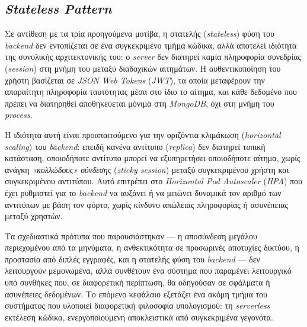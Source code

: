 \subsection{\textit{Stateless Pattern}}

Σε αντίθεση με τα τρία προηγούμενα μοτίβα, η στατελής (\textit{stateless}) φύση του \textit{backend} δεν εντοπίζεται σε ένα συγκεκριμένο τμήμα κώδικα, αλλά αποτελεί ιδιότητα της συνολικής αρχιτεκτονικής του: ο \textit{server} δεν διατηρεί καμία πληροφορία συνεδρίας (\textit{session}) στη μνήμη του μεταξύ διαδοχικών αιτημάτων. Η αυθεντικοποίηση του χρήστη βασίζεται σε \textit{JSON Web Tokens} (\textit{JWT}), τα οποία μεταφέρουν την απαραίτητη πληροφορία ταυτότητας μέσα στο ίδιο το αίτημα, και κάθε δεδομένο που πρέπει να διατηρηθεί αποθηκεύεται μόνιμα στη \textit{MongoDB}, όχι στη μνήμη του \textit{process}.

Η ιδιότητα αυτή είναι προαπαιτούμενο για την οριζόντια κλιμάκωση (\textit{horizontal scaling}) του \textit{backend}: επειδή κανένα αντίτυπο (\textit{replica}) δεν διατηρεί τοπική κατάσταση, οποιοδήποτε αντίτυπο μπορεί να εξυπηρετήσει οποιοδήποτε αίτημα, χωρίς ανάγκη \textit{«κολλώδους» σύνδεσης} (\textit{sticky session}) μεταξύ συγκεκριμένου χρήστη και συγκεκριμένου αντιτύπου. Αυτό επιτρέπει στο \textit{Horizontal Pod Autoscaler} (\textit{HPA}) που έχει ρυθμιστεί για το \textit{backend} να αυξάνει ή να μειώνει δυναμικά τον αριθμό των αντιτύπων με βάση τον φόρτο, χωρίς κίνδυνο απώλειας πληροφορίας ή ασυνέπειας μεταξύ χρηστών.


Τα σχεδιαστικά πρότυπα που παρουσιάστηκαν --- η αποσύνδεση μεγάλου περιεχομένου από τα μηνύματα, η ανθεκτικότητα σε προσωρινές αποτυχίες δικτύου, η προστασία από διπλές εγγραφές, και η στατελής φύση του \textit{backend} --- δεν λειτουργούν μεμονωμένα, αλλά συνθέτουν ένα σύστημα που παραμένει λειτουργικό υπό συνθήκες που, σε διαφορετική περίπτωση, θα οδηγούσαν σε σφάλματα ή ασυνέπειες δεδομένων. Το επόμενο κεφάλαιο εξετάζει ένα ακόμη τμήμα του συστήματος που υλοποιεί διαφορετική φιλοσοφία υπολογισμού: τη \textit{serverless} εκτέλεση κώδικα, ενεργοποιούμενη αποκλειστικά από συγκεκριμένα γεγονότα.